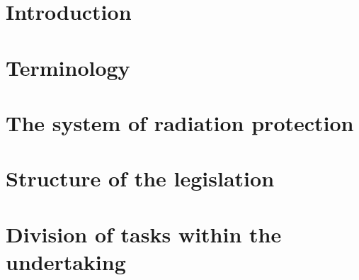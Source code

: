 \section{Introduction}
\section{Terminology}
\section{The system of radiation protection}
\section{Structure of the legislation}
\section{Division of tasks within the undertaking}
